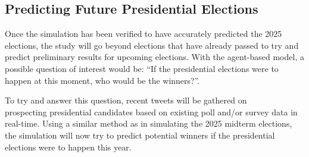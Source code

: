 \subsection{Predicting Future Presidential Elections}
Once the simulation has been verified to have accurately predicted the 2025 elections, the study will go beyond elections that have already passed to try and predict preliminary results for upcoming elections. With the agent-based model, a possible question of interest would be: “If the presidential elections were to happen at this moment, who would be the winners?”.  

To try and answer this question, recent tweets will be gathered on\\
prospecting presidential candidates based on existing poll and/or survey data in real-time. Using a similar method as in simulating the 2025 midterm elections, the simulation will now try to predict potential winners if the presidential elections were to happen this year. 